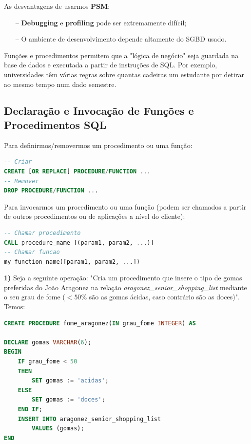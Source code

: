 \documentclass[oneside]{book}
\theoremstyle{definition}
\begin{document}
As desvantagens de usarmos \textbf{PSM}:
\begin{itemize}
    \item[--] \textbf{Debugging} e \textbf{profiling} pode ser extremamente difícil;
    \item[--] O ambiente de desenvolvimento depende altamente do SGBD usado.
\end{itemize}

Funções e procedimentos permitem que a "lógica de negócio" seja guardada na base de dados e executada a partir de instruções de SQL. Por exemplo, universidades têm várias regras sobre quantas cadeiras um estudante por detirar ao mesmo tempo num dado semestre. 

\subsection{Declaração e Invocação de Funções e Procedimentos SQL}
Para definirmos/removermos um procedimento ou uma função:
\begin{lstlisting}[language=SQL, morekeywords={PROCEDURE, FUNCTION, REPLACE}, framesep=8pt, xleftmargin=40pt, framexleftmargin=40pt, frame=tb, framerule=0pt]
-- Criar
CREATE [OR REPLACE] PROCEDURE/FUNCTION ...
-- Remover
DROP PROCEDURE/FUNCTION ...
\end{lstlisting}

Para invocarmos um procedimento ou uma função (podem ser chamados a partir de outros procedimentos ou de aplicações a nível do cliente):
\begin{lstlisting}[language=SQL, morekeywords={CALL}, framesep=8pt, xleftmargin=40pt, framexleftmargin=40pt, frame=tb, framerule=0pt]
-- Chamar procedimento
CALL procedure_name [(param1, param2, ...)]
-- Chamar funcao
my_function_name([param1, param2, ...])
\end{lstlisting}

\textbf{1)} Seja a seguinte operação: "Cria um procedimento que insere o tipo de gomas preferidas do João Aragonez na relação \textit{aragonez\_senior\_shopping\_list} mediante o seu grau de fome ($<50\%$ são as gomas ácidas, caso contrário são as doces)". Temos:
\begin{lstlisting}[language=SQL, morekeywords={CALL, DECLARE, PROCEDURE, IF}, framesep=8pt, xleftmargin=40pt, framexleftmargin=40pt, frame=tb, framerule=0pt]
CREATE PROCEDURE fome_aragonez(IN grau_fome INTEGER) AS

DECLARE gomas VARCHAR(6);
BEGIN
    IF grau_fome < 50
    THEN
        SET gomas := 'acidas';
    ELSE
        SET gomas := 'doces';
    END IF;
    INSERT INTO aragonez_senior_shopping_list
        VALUES (gomas);
END
\end{lstlisting}
\end{document}
